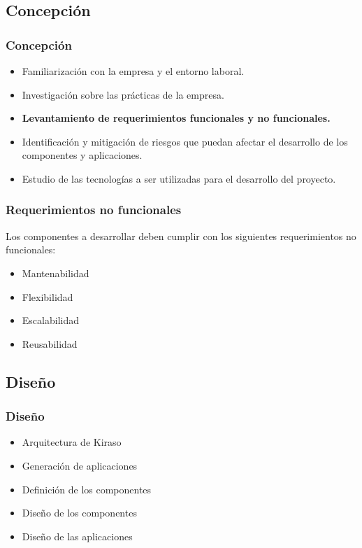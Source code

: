 \documentclass{beamer}
\begin{document}

\subsection{Concepción}


\begin{frame}[fragile]
\frametitle{Concepción}
\begin{itemize}
\item Familiarización con la empresa y el entorno laboral.
\item Investigación sobre las prácticas de la empresa.
\item \textbf{Levantamiento de requerimientos funcionales y no funcionales.}
\item Identificación y mitigación de riesgos que puedan afectar el desarrollo de los componentes y aplicaciones.
\item Estudio de las tecnologías a ser utilizadas para el desarrollo del proyecto.
\end{itemize}
\end{frame}




\begin{frame}[fragile]
\frametitle{Requerimientos no funcionales}

Los componentes a desarrollar deben cumplir con los siguientes requerimientos no funcionales: 


\begin{itemize}
	\item Mantenabilidad
	\item Flexibilidad
	\item Escalabilidad
	\item Reusabilidad
\end{itemize}
\end{frame}


\subsection{Diseño}

\begin{frame}[fragile]
\frametitle{Diseño}
\begin{itemize}
\item Arquitectura de Kiraso
\item Generación de aplicaciones
\item Definición de los componentes
\item Diseño de los componentes
\item Diseño de las aplicaciones
\end{itemize}

\end{frame}
\end{document}
